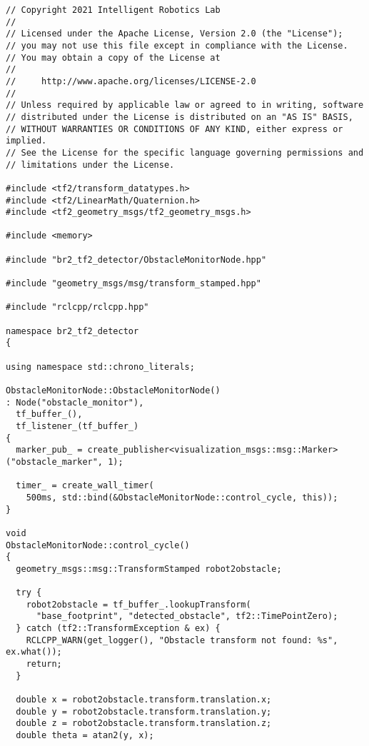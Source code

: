 \footnotesize
\begin{tcolorbox}[sharp corners, colframe=gray!80, colback=LightGray, left=0pt, top=0pt, bottom=0pt, title=\texttt{br2\_tf2\_detector/src/br2\_tf2\_detector/ObstacleMonitorNode.cpp}]
  \begin{verbatim}
// Copyright 2021 Intelligent Robotics Lab
//
// Licensed under the Apache License, Version 2.0 (the "License");
// you may not use this file except in compliance with the License.
// You may obtain a copy of the License at
//
//     http://www.apache.org/licenses/LICENSE-2.0
//
// Unless required by applicable law or agreed to in writing, software
// distributed under the License is distributed on an "AS IS" BASIS,
// WITHOUT WARRANTIES OR CONDITIONS OF ANY KIND, either express or implied.
// See the License for the specific language governing permissions and
// limitations under the License.

#include <tf2/transform_datatypes.h>
#include <tf2/LinearMath/Quaternion.h>
#include <tf2_geometry_msgs/tf2_geometry_msgs.h>

#include <memory>

#include "br2_tf2_detector/ObstacleMonitorNode.hpp"

#include "geometry_msgs/msg/transform_stamped.hpp"

#include "rclcpp/rclcpp.hpp"

namespace br2_tf2_detector
{

using namespace std::chrono_literals;

ObstacleMonitorNode::ObstacleMonitorNode()
: Node("obstacle_monitor"),
  tf_buffer_(),
  tf_listener_(tf_buffer_)
{
  marker_pub_ = create_publisher<visualization_msgs::msg::Marker>("obstacle_marker", 1);

  timer_ = create_wall_timer(
    500ms, std::bind(&ObstacleMonitorNode::control_cycle, this));
}

void
ObstacleMonitorNode::control_cycle()
{
  geometry_msgs::msg::TransformStamped robot2obstacle;

  try {
    robot2obstacle = tf_buffer_.lookupTransform(
      "base_footprint", "detected_obstacle", tf2::TimePointZero);
  } catch (tf2::TransformException & ex) {
    RCLCPP_WARN(get_logger(), "Obstacle transform not found: %s", ex.what());
    return;
  }

  double x = robot2obstacle.transform.translation.x;
  double y = robot2obstacle.transform.translation.y;
  double z = robot2obstacle.transform.translation.z;
  double theta = atan2(y, x);


\end{verbatim}
\end{tcolorbox}
